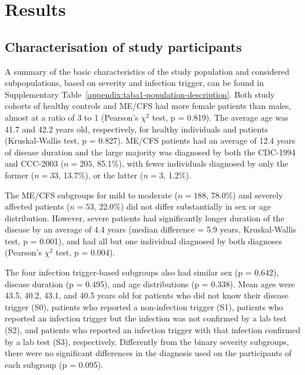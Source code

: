 \section{Results}

\subsection{Characterisation of study participants}

A summary of the basic characteristics of the study population and considered subpopulations, based on severity and infection trigger, can be found in Supplementary Table~\ref{appendix:taba1-population-description}.
Both study cohorts of healthy controls and ME/CFS had more female patients than males, almost at a ratio of 3 to 1 (Pearson's $\chi^2$ test, p = 0.819).
The average age was 41.7 and 42.2 years old, respectively, for healthy individuals and patients (Kruskal-Wallis test, p = 0.827).
ME/CFS patients had an average of 12.4 years of disease duration and the large majority was diagnosed by both the CDC-1994 and CCC-2003 ($n = 205$, 85.1\%), with fewer individuals diagnosed by only the former ($n = 33$, 13.7\%), or the latter ($n = 3$, 1.2\%).

The ME/CFS subgroups for mild to moderate ($n = 188$, 78.0\%) and severely affected patients ($n = 53$, 22.0\%) did not differ substantially in sex or age distribution.
However, severe patients had significantly longer duration of the disease by an average of 4.4 years (median difference = 5.9 years, Kruskal-Wallis test, p = 0.001), and had all but one individual diagnosed by both diagnoses (Pearson's $\chi^2$ test, p = 0.004).

The four infection trigger-based subgroups also had similar sex (p = 0.642), disease duration (p = 0.495), and age distributions (p = 0.338).
Mean ages were 43.5, 40.2, 43.1, and 40.5 years old for patients who did not know their disease trigger (S0), patients who reported a non-infection trigger (S1), patients who reported an infection trigger but the infection was not confirmed by a lab test (S2), and patients who reported an infection trigger with that infection confirmed by a lab test (S3), respectively.
Differently from the binary severity subgroups, there were no significant differences in the diagnosis used on the participants of each subgroup (p = 0.095).


